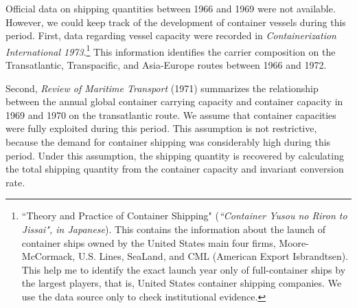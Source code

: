 Official data on shipping quantities between 1966 and 1969 were not available. However, we could keep track of the development of container vessels during this period. First, data regarding vessel capacity were recorded in \textit{Containerization International 1973}.\footnote{``Theory and Practice of Container Shipping" (\textit{``Container Yusou no Riron to Jissai", in Japanese}). This contains the information about the launch of container ships owned by the United States main four firms, Moore-McCormack, U.S. Lines, SeaLand, and CML (American Export Isbrandtsen). This help me to identify the exact launch year only of full-container ships by the largest players, that is, United States container shipping companies. We use the data source only to check institutional evidence.} This information identifies the carrier composition on the Transatlantic, Transpacific, and Asia-Europe routes between 1966 and 1972.

Second, \textit{Review of Maritime Transport} (1971) summarizes the relationship between the annual global container carrying capacity and container capacity in 1969 and 1970 on the transatlantic route. We assume that container capacities were fully exploited during this period. This assumption is not restrictive, because the demand for container shipping was considerably high during this period. Under this assumption, the shipping quantity is recovered by calculating the total shipping quantity from the container capacity and invariant conversion rate.

